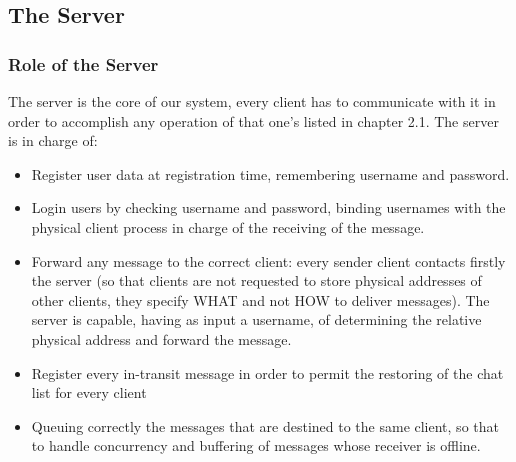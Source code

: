 \subsection{The Server}
\subsubsection{Role of the Server}
The server is the core of our system, every client has to communicate with it in order to accomplish any operation of that one’s listed in chapter 2.1.
The server is in charge of:

\begin{itemize}
	\item Register user data at registration time, remembering username and password.
	\item Login users by checking username and password, binding usernames with the physical client process in charge of the receiving of the message.
	\item Forward any message to the correct client: every sender client contacts firstly the server (so that clients are not requested to store physical addresses of other clients, they specify WHAT and not HOW to deliver messages). The server is capable, having as input a username, of determining the relative physical address and forward the message.
	\item Register every in-transit message in order to permit the restoring of the chat list for every client
	\item Queuing correctly the messages that are destined to the same client, so that to handle concurrency and buffering of messages whose receiver is offline. 
\end{itemize}

